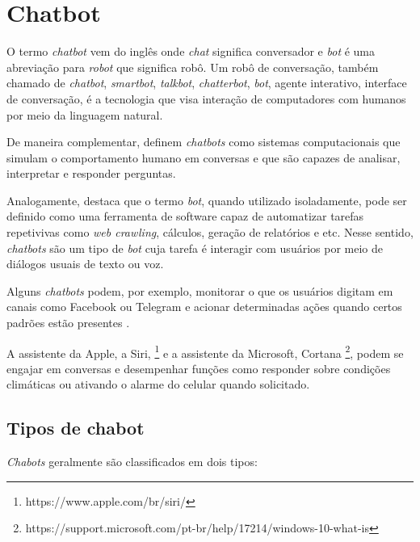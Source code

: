 \section{Chatbot}


 O termo \textit{chatbot} vem do inglês onde \textit{chat} significa conversador e \textit{bot} é uma abreviação para \textit{robot} que significa robô. Um robô de conversação, também chamado de \textit{chatbot}, \textit{smartbot}, \textit{talkbot}, \textit{chatterbot}, \textit{bot},  agente interativo, interface de conversação, é a tecnologia que visa interação de computadores com humanos por meio da linguagem natural. 



De maneira complementar,  definem \textit{chatbots}
como sistemas computacionais que simulam o comportamento humano em conversas e que são capazes
de analisar, interpretar e responder perguntas.

Analogamente,  destaca que o termo \textit{bot}, quando utilizado isoladamente, pode ser definido como uma ferramenta de software capaz de automatizar tarefas repetivivas como \textit{web crawling}, cálculos, geração de relatórios e etc. Nesse sentido, \textit{chatbots} são um tipo de \textit{bot} cuja tarefa é interagir com usuários por meio de diálogos usuais de texto ou voz.

Alguns \textit{chatbots} podem, por exemplo, monitorar o que os usuários digitam em canais como Facebook ou Telegram e acionar determinadas ações quando certos padrões estão presentes \cite{paikari2018framework}. 

A assistente da Apple, a Siri, \footnote{https://www.apple.com/br/siri/}
e a assistente da Microsoft,
Cortana \footnote{https://support.microsoft.com/pt-br/help/17214/windows-10-what-is}, podem se engajar em conversas e desempenhar funções como responder sobre condições climáticas ou ativando o alarme do celular quando solicitado.


\subsection{Tipos de chabot}

\textit{Chabots} geralmente são classificados em dois tipos:

